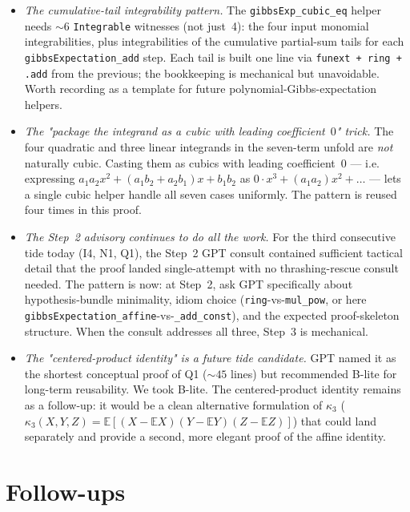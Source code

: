 \documentclass[11pt]{article}
\begin{document}
\begin{itemize}[leftmargin=1em,itemsep=0.2em]
\item \emph{The cumulative-tail integrability pattern.} The
  \texttt{gibbsExp\_cubic\_eq} helper needs
  $\sim 6$ \texttt{Integrable} witnesses (not just~4): the four input
  monomial integrabilities, plus integrabilities of the cumulative
  partial-sum tails for each \texttt{gibbsExpectation\_add} step.
  Each tail is built one line via \texttt{funext + ring + .add} from
  the previous; the bookkeeping is mechanical but unavoidable. Worth
  recording as a template for future polynomial-Gibbs-expectation
  helpers.

\item \emph{The "package the integrand as a cubic with leading
  coefficient~$0$" trick.} The four quadratic and three linear
  integrands in the seven-term unfold are \emph{not} naturally cubic.
  Casting them as cubics with leading coefficient~$0$ — i.e. expressing
  $a_1 a_2 x^2 + (a_1 b_2 + a_2 b_1) x + b_1 b_2$ as
  $0 \cdot x^3 + (a_1 a_2) x^2 + \ldots$ — lets a single cubic helper
  handle all seven cases uniformly. The pattern is reused four times
  in this proof.

\item \emph{The Step~2 advisory continues to do all the work.} For
  the third consecutive tide today (I4, N1, Q1), the Step~2 GPT
  consult contained sufficient tactical detail that the proof landed
  single-attempt with no thrashing-rescue consult needed. The
  pattern is now: at Step~2, ask GPT specifically about
  hypothesis-bundle minimality, idiom choice (\texttt{ring}-vs-\texttt{mul\_pow},
  or here \texttt{gibbsExpectation\_affine}-vs-\texttt{\_add\_const}), and the
  expected proof-skeleton structure. When the consult addresses all
  three, Step~3 is mechanical.

\item \emph{The "centered-product identity" is a future tide
  candidate.} GPT named it as the shortest conceptual proof of Q1
  ($\sim 45$ lines) but recommended B-lite for long-term reusability.
  We took B-lite. The centered-product identity remains as a
  follow-up: it would be a clean alternative formulation of $\kappa_3$
  ($\kappa_3(X,Y,Z) = \mathbb E[(X - \mathbb E X)(Y - \mathbb E
  Y)(Z - \mathbb E Z)]$) that could land separately and provide a
  second, more elegant proof of the affine identity.
\end{itemize}

\section{Follow-ups}
\end{document}
